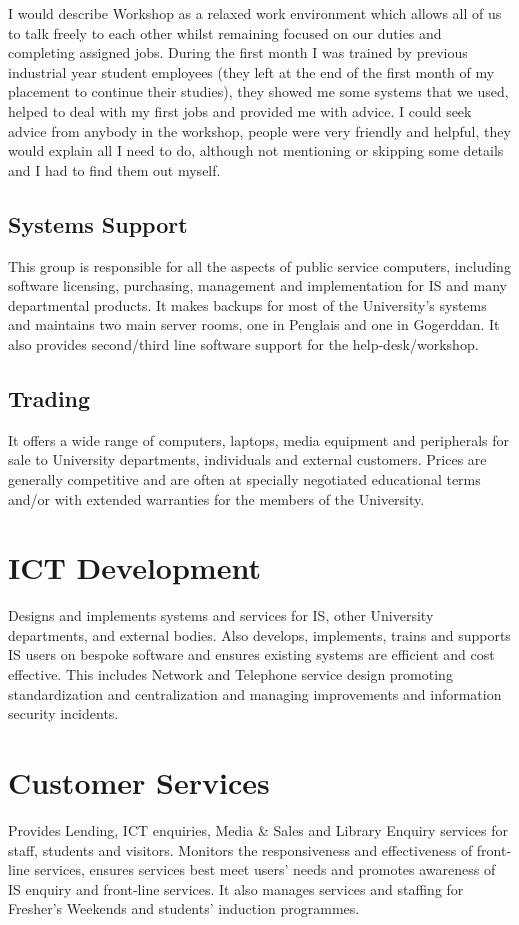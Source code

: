 \documentclass[10pt,a4paper,headinclude=true]{report}
\begin{document}
I would describe Workshop as a relaxed work environment which allows all of us to talk freely to each other whilst remaining focused on our duties and completing assigned jobs. During the first month I was trained by previous industrial year student employees (they left at the end of the first month of my placement to continue their studies), they showed me some systems that we used, helped to deal with my first jobs and provided me with advice. I could seek advice from anybody in the workshop, people were very friendly and helpful, they would explain all I need to do, although not mentioning or skipping some details and I had to find them out myself.
\subsection{Systems Support}
This group is responsible for all the aspects of public service computers, including software licensing, purchasing, management and implementation for IS and many departmental products. It makes backups for most of the University's systems and maintains two main server rooms, one in Penglais and one in Gogerddan. It also provides second/third line software support for the help-desk/workshop.\cite{InternalTeamdescription}
\subsection{Trading}
It offers a wide range of computers, laptops, media equipment and peripherals for sale to University departments, individuals and external customers. Prices are generally competitive and are often at specially negotiated educational terms and/or with extended warranties for the members of the University.\cite{InternalTeamdescription}
\section{ICT Development}
Designs and implements systems and services for IS, other University departments, and external bodies. Also develops, implements, trains and supports IS users on bespoke software and ensures existing systems are efficient and cost effective. This includes Network and Telephone service design promoting standardization and centralization and managing improvements and information security incidents.\cite{InternalTeamdescription}
\section{Customer Services}
Provides Lending, ICT enquiries, Media \& Sales and Library Enquiry services for staff, students and visitors. Monitors the responsiveness and effectiveness of front-line services, ensures services best meet users' needs and promotes awareness of IS enquiry and front-line services. It also manages services and staffing for Fresher's Weekends and students' induction programmes.\cite{InternalTeamdescription}
\end{document}
